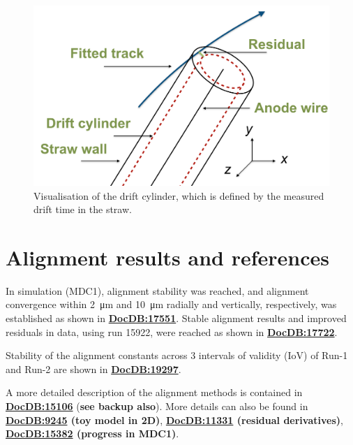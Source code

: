 \documentclass[12pt]{article}
\begin{document}
\begin{figure}[tbp]
\centering
\includegraphics[scale = 0.45]{fig/DriftCylinder.png}  
    \caption{Visualisation of the drift cylinder, which is defined by the measured drift time in the straw.}
\label{fig:DriftCylinder} 
\end{figure}

\section{Alignment results and references}
In simulation (MDC1), alignment stability was reached, and alignment convergence within \SI{2}{\micro\metre} and \SI{10}{\micro\metre} radially and vertically, respectively, was established as shown in \textbf{\href{https://gm2-docdb.fnal.gov/cgi-bin/private/ShowDocument?docid=17551}{DocDB:17551}}. Stable alignment results and improved residuals in data, using run 15922, were reached as shown in \textbf{\href{https://gm2-docdb.fnal.gov/cgi-bin/private/ShowDocument?docid=17722}{DocDB:17722}}.

Stability of the alignment constants across 3 intervals of validity (IoV) of Run-1 and Run-2 are shown in \textbf{\href{https://gm2-docdb.fnal.gov/cgi-bin/private/ShowDocument?docid=19297}{DocDB:19297}}.

A more detailed description of the alignment methods is contained in \textbf{\href{https://gm2-docdb.fnal.gov/cgi-bin/private/ShowDocument?docid=15106}{DocDB:15106}} (\textbf{see backup also}). More details can also be found in \textbf{\href{https://gm2-docdb.fnal.gov/cgi-bin/private/ShowDocument?docid=9245}{DocDB:9245} (toy model in 2D)}, \textbf{\href{https://gm2-docdb.fnal.gov/cgi-bin/private/ShowDocument?docid=11331}{DocDB:11331} (residual derivatives)}, \textbf{\href{https://gm2-docdb.fnal.gov/cgi-bin/private/ShowDocument?docid=15382}{DocDB:15382} (progress in MDC1)}. 
\end{document}

